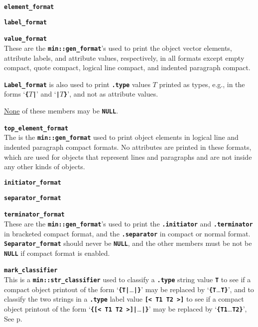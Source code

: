 \documentclass[12pt]{article}
\makeatletter
\newcommand{\TT}[1]{{\tt \bfseries #1}}
\newcommand{\ttmkey}[2]{\TT{#1}\index{#1@{\tt #1}!#2}}
\newcommand{\pagref}[1]{p\pageref{#1}}
\newcommand{\EOL}{\penalty \exhyphenpenalty}
\newenvironment{itemlist}[1][1.2in]%
	{\begin{list}{}{\setlength{\labelwidth}{#1}%
		        \setlength{\leftmargin}{\labelwidth}%
		        \addtolength{\leftmargin}{+0.2in}%
		        \renewcommand{\makelabel}[1]{##1\hfill}}}%
	{\end{list}}
\makeatother
\begin{document}
\begin{itemlist}[0.2in]
\item[\ttmkey{element\_format}{in {\tt min::obj\_format}}]
\item[\ttmkey{label\_format}{in {\tt min::obj\_format}}]\vspace{-2ex}
\item[\ttmkey{value\_format}{in {\tt min::obj\_format}}]\vspace{-2ex}~\\
These are the \TT{min::gen\_format}'s used to print the
object vector elements,
attribute labels, and attribute values, respectively, in all formats
except empty compact, quote compact, logical line compact,
and indented paragraph compact.

\TT{Label\_\EOL format} is also used to print \TT{.type} values $T$
printed as types, e.g., in the forms `\TT{\{$T$|}' and `\TT{|$T$\}}',
and not as attribute values.

\underline{None} of these members may be \TT{NULL}.

\item[\ttmkey{top\_element\_format}{in {\tt min::obj\_format}}]~\\
The is the \TT{min::gen\_format} used to print object elements
in logical line and indented paragraph compact formats.
No attributes are printed in these formats, which are used for
objects that represent lines and paragraphs and are not inside
any other kinds of objects.

\item[\ttmkey{initiator\_format}{in {\tt min::obj\_format}}]
\item[\ttmkey{separator\_format}{in {\tt min::obj\_format}}]\vspace{-2ex}
\item[\ttmkey{terminator\_format}{in {\tt min::obj\_format}}]\vspace{-2ex}~\\
These are the \TT{min::gen\_format}'s used to print the
\TT{.initiator} and \TT{.terminator} in bracketed compact
format, and the \TT{.separator} in compact or normal format.
\TT{Separator\_\EOL format} should never be \TT{NULL}, and the
other members must be not be \TT{NULL} if compact
format is enabled.

\item[\ttmkey{mark\_classifier}{in {\tt min::obj\_format}}]~\\
\label{MARK_CLASSIFIER}
This is a \TT{min::str\_classifier} used to classify
a \TT{.type} string value \TT{T} to see if
a compact object printout of the
form `\TT{\{T|}\ldots\TT{|\}}' may be replaced by `\TT{\{T}\ldots\TT{T\}}',
and to classify the two strings in a \TT{.type} label value \TT{[< T1 T2 >]}
to see if a compact object printout of the
form `\TT{\{[< T1 T2 >]|}\ldots\TT{|\}}' may be replaced by
`\TT{\{T1}\ldots\TT{T2\}}',
See \pagref{MARK_CLASSIFIER_USAGE}.


\end{itemlist}
\end{document}
